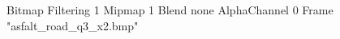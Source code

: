 {Bitmap
	{Filtering 1}
	{Mipmap 1}
	{Blend none}
	{AlphaChannel 0}
	{Frame "asfalt_road_q3_x2.bmp"}
}
